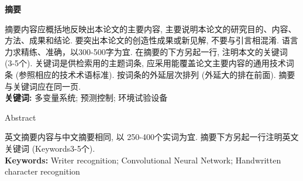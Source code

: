 \setcounter{page}{1}
\begin{center}
\bfseries
 摘\quad 要
\end{center}
\thispagestyle{plain}
\begin{spacing}{1.5}
摘要内容应概括地反映出本论文的主要内容, 主要说明本论文的研究目的、内容、方法、成果和结论. 要突出本论文的创造性成果或新见解, 不要与引言相混淆. 语言力求精练、准确，以300-500字为宜. 在摘要的下方另起一行, 注明本文的关键词 (3-5个). 关键词是供检索用的主题词条, 应采用能覆盖论文主要内容的通用技术词条 (参照相应的技术术语标准). 按词条的外延层次排列 (外延大的排在前面). 摘要与关键词应在同一页.
\ \\
\textbf{关键词: }多变量系统; 预测控制; 环境试验设备
\end{spacing}
\pagebreak[4]
\thispagestyle{plain}

\begin{center}
Abstract
\end{center}
\begin{spacing}{1.5}
英文摘要内容与中文摘要相同, 以 250-400个实词为宜. 摘要下方另起一行注明英文关键词 (Keywords3-5个).
\ \\
\textbf{Keywords: }Writer recognition; Convolutional Neural Network; Handwritten character recognition
\end{spacing}
\pagebreak[4]